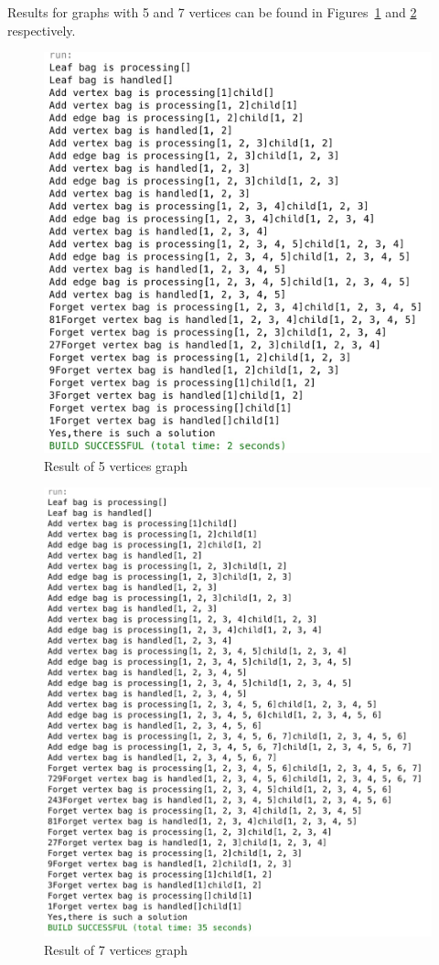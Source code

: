 Results for graphs with 5 and 7 vertices can be found in Figures~\ref{fig:graph5} and \ref{fig:graph7} respectively.

\begin{figure}[ht!] 
  \centering
  \includegraphics[width=.8\textwidth]{a11.png}
  \caption{Result of 5 vertices graph}
  \label{fig:graph5}
\end{figure}

\begin{figure}[ht!] 
  \centering
  \includegraphics[width=.8\textwidth]{a12.png}
  \caption{Result of 7 vertices graph}
  \label{fig:graph7}
\end{figure}
